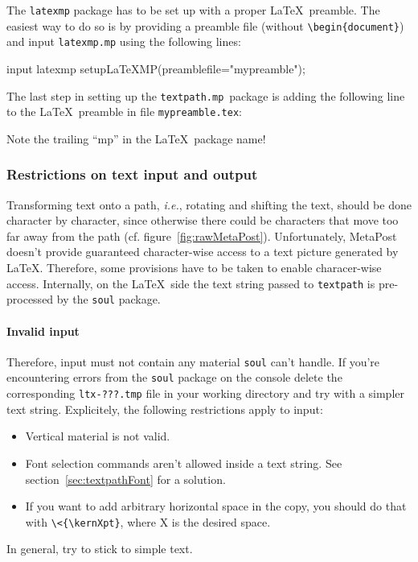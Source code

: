 \documentclass{article}
\newcommand*{\cmd}[1]{\texttt{#1}}
\newcommand*{\pkg}{\cmd{textpath.mp}}
\newenvironment{listing}{%
  \small%
  \verbatim%
}{%
  \endverbatim%
}
\begin{document}
The \cmd{latexmp} package has to be set up with a proper \LaTeX\ preamble.  The easiest way to do so is by providing a preamble file (without \verb+\begin{document}+) and input \cmd{latexmp.mp} using the following lines:

\begin{listing}
input latexmp
setupLaTeXMP(preamblefile="mypreamble");
\end{listing}

The last step in setting up the \pkg\ package is adding the following line to the \LaTeX\ preamble in file \cmd{mypreamble.tex}:

\begin{listing}
\usepackage{textpathmp}
\end{listing}
Note the trailing ``mp'' in the \LaTeX\ package name!

\subsubsection{Restrictions on text input and output}\label{sec:restrictions}
Transforming text onto a path, \emph{i.e.}, rotating and shifting the text, should be done character by character, since otherwise there could be characters that move too far away from the path (cf. figure~\ref{fig:rawMetaPost}).  Unfortunately, MetaPost doesn't provide guaranteed character-wise access to a text picture generated by \LaTeX.  Therefore, some provisions have to be taken to enable characer-wise access.  Internally, on the \LaTeX\ side the text string passed to \cmd{textpath} is pre-processed by the \cmd{soul} package.

\paragraph{Invalid input}  Therefore, input must not contain any material \cmd{soul} can't handle.  If you're encountering errors from the \cmd{soul} package on the console delete the corresponding \cmd{ltx-???.tmp} file in your working directory and try with a simpler text string.  Explicitely, the following restrictions apply to input:
\begin{itemize}
\item Vertical material is not valid.
\item Font selection commands aren't allowed inside a text string.  See section~\ref{sec:textpathFont} for a solution.
\item If you want to add arbitrary horizontal space in the copy, you should do that with \verb+\<{\kernXpt}+, where X is the desired space.
\end{itemize}
In general, try to stick to simple text.
\end{document}
